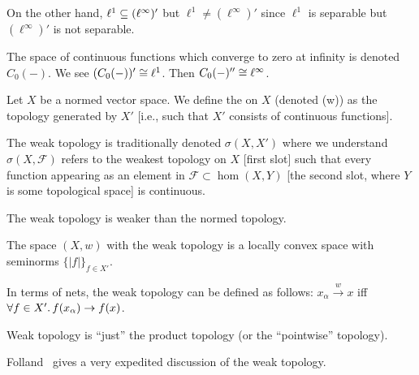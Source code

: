 \begin{example}
On the other hand, $\ell^{1}\propersubset(\ell^{\infty})'$ but
$\ell^{1}\neq(\ell^{\infty})'$ since $\ell^{1}$ is separable but
$(\ell^{\infty})'$ is not separable.
\end{example}

\begin{example}
The space of continuous functions which converge to zero at infinity
is denoted $C_{0}(-)$. We see $(C_{0}(-))'\cong\ell^{1}$.
Then $C_{0}(-)''\cong\ell^{\infty}$.
\end{example}

\begin{definition}
Let $X$ be a normed vector space.
We define the  on $X$ (denoted (w)) as the
topology generated by $X'$ [i.e., such that $X'$ consists of
  continuous functions].

The weak topology is traditionally denoted $\sigma(X,X')$ where we
understand $\sigma(X,\mathcal{F})$ refers to the weakest topology on $X$
[first slot] such that every function appearing as an element in
$\mathcal{F}\subset\hom(X,Y)$ [the second slot, where $Y$ is some
  topological space] is continuous.

The weak topology is weaker than the normed topology.
\end{definition}

\begin{node}
The space $(X,w)$ with the weak topology is a locally convex space
with seminorms $\{|f|\}_{f\in X'}$.
\end{node}

\begin{node}
In terms of nets, the weak topology can be defined as follows:
$x_{\alpha}\xrightarrow{w}x$ iff $\forall f\in X'\ldotp f(x_{\alpha})\to f(x)$.
\end{node}

\begin{node}
Weak topology is ``just'' the product topology (or the ``pointwise''
topology). 
\end{node}

\begin{remark}
Folland~\cite[pp.168--169]{folland1999real} gives a very expedited
discussion of the weak topology.
\end{remark}